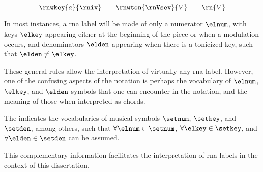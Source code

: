 \begin{equation}
    \label{eq:rn_three_annotations}
    \rnwkey{a}{\rniv} \qquad \rnwton{\rnVsev}{V} \qquad \rn{V}
\end{equation}


In most instances, a \gls{rna} label will be made of only a
numerator $\elnum$, with keys $\elkey$ appearing either at
the beginning of the piece or when a modulation occurs, and
denominators $\elden$ appearing when there is a tonicized
key, such that $\elden \neq \elkey$.

These general rules allow the interpretation of virtually
any \gls{rna} label. However, one of the confusing aspects
of the notation is perhaps the vocabulary of $\elnum$,
$\elkey$, and $\elden$ symbols that one can encounter in the
notation, and the meaning of those when interpreted as
chords.

The 
indicates the vocabularies of musical symbols $\setnum$,
$\setkey$, and $\setden$, among others, such that $\forall
\elnum \in \setnum$, $\forall \elkey \in \setkey$, and
$\forall \elden \in \setden$ can be assumed.

This complementary information facilitates the
interpretation of \gls{rna} labels in the context of this
dissertation.
